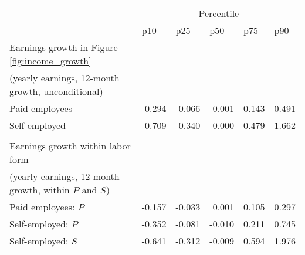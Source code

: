 \begin{tabular}{lrrrrr}
\toprule
      & \multicolumn{5}{c}{Percentile} \\
\cmidrule{2-6}      & \multicolumn{1}{l}{p10} & \multicolumn{1}{l}{p25} & \multicolumn{1}{l}{p50} & \multicolumn{1}{l}{p75} & \multicolumn{1}{l}{p90} \\
\midrule
Earnings growth in Figure \ref{fig:income_growth} &       &       &       &       &  \\
(yearly earnings, 12-month growth, unconditional) &       &       &       &       &  \\
\quad Paid employees & -0.294 & -0.066 & 0.001 & 0.143 & 0.491 \\
\quad Self-employed & -0.709 & -0.340 & 0.000 & 0.479 & 1.662 \\
      &       &       &       &       &  \\
Earnings growth within labor form &       &       &       &       &  \\
(yearly earnings, 12-month growth, within $P$ and $S$) &       &       &       &       &  \\
\quad Paid employees: $P$ & -0.157 & -0.033 & 0.001 & 0.105 & 0.297 \\
\quad Self-employed: $P$ & -0.352 & -0.081 & -0.010 & 0.211 & 0.745 \\
\quad Self-employed: $S$ & -0.641 & -0.312 & -0.009 & 0.594 & 1.976 \\
\bottomrule
\end{tabular}%
